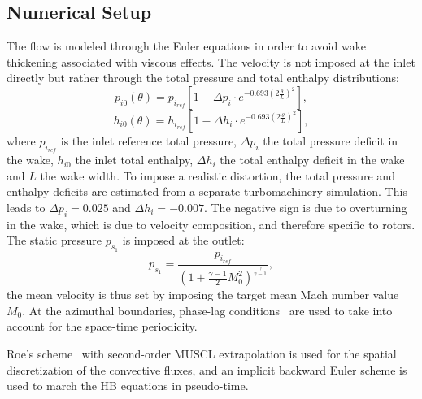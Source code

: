 \subsection{Numerical Setup}

The flow is modeled through the 
Euler equations in order to avoid wake thickening
associated with viscous effects. 
The velocity is not imposed at the inlet directly
but rather through the total pressure and total enthalpy distributions:
\begin{equation}
  \label{eq:rotatingblocks_ptot}
    p_{i0} (\theta) = p_{i_{ref}} \left[1 - 
        \Delta p_i \cdot e^{
          -0.693 \left( 2 \frac{\theta}{L} \right) ^ 2}\right],
\end{equation}
\begin{equation}
  \label{eq:rotatingblocks_htot}
    h_{i0} (\theta) = h_{i_{ref}} \left[1 - 
        \Delta h_i \cdot e^{
          -0.693 \left( 2 \frac{\theta}{L} \right) ^ 2}\right],
\end{equation}
where $p_{i_{ref}}$ is the inlet reference total pressure, $\Delta p_i$ the total pressure
deficit in the wake,
$h_{i0}$ the inlet total enthalpy, $\Delta h_i$ the total enthalpy
deficit in the wake and $L$ the wake width.
To impose a realistic distortion, the total pressure and
enthalpy deficits are estimated from a separate turbomachinery simulation.
This leads to $\Delta p_i = 0.025$ and 
$\Delta h_i = - 0.007$.
The negative sign is due to overturning in the wake, which
is due to velocity composition, and therefore specific to rotors.
The static pressure $p_{s_1}$ is imposed at the outlet:
\begin{equation}
    p_{s_1} = \frac{p_{i_{ref}}}{\left(1 + 
    \frac{\gamma - 1}{2} M_{0}^2 \right) ^ {\frac{\gamma}{ \gamma - 1}}} ,
\end{equation}
the mean velocity is thus set by imposing the
target mean Mach number value $M_{0}$.
At the azimuthal boundaries, phase-lag conditions~\cite{Erdos1977} 
are used to take into account for the space-time periodicity.

Roe's scheme~\cite{Roe1981} with second-order MUSCL extrapolation 
is used for the spatial discretization of
the convective fluxes, and an implicit backward Euler scheme is used
to march the HB equations in pseudo-time.

